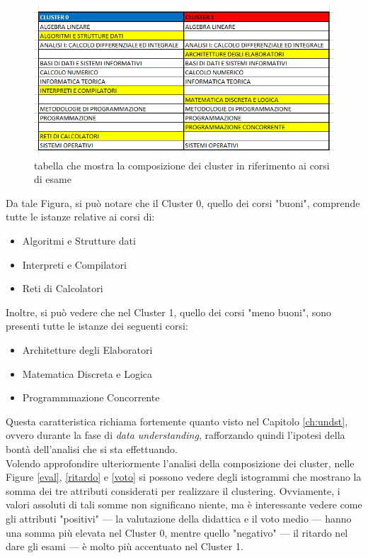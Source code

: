         \begin{figure}
            \centering
            \caption{tabella che mostra la composizione dei cluster in riferimento ai corsi di esame}
            \label{tabella}
            \includegraphics[scale=0.65]{../cluster/min_kmeans_2cl_corsi_cluster.png}
        \end{figure}

        Da tale Figura, si può notare che il Cluster 0, quello dei corsi "buoni", comprende tutte le istanze relative ai corsi di:

        \begin{itemize}
            \item Algoritmi e Strutture dati
            \item Interpreti e Compilatori
            \item Reti di Calcolatori
        \end{itemize}

        Inoltre, si può vedere che nel Cluster 1, quello dei corsi "meno buoni", sono presenti tutte le istanze dei seguenti corsi:

        \begin{itemize}
            \item Architetture degli Elaboratori
            \item Matematica Discreta e Logica
            \item Programmmazione Concorrente
        \end{itemize}

        Questa caratteristica richiama fortemente quanto visto nel Capitolo \ref{ch:undst}, ovvero durante la fase di \textit{data understanding}, rafforzando quindi l'ipotesi della bontà dell'analisi che si sta effettuando. \\

        Volendo approfondire ulteriormente l'analisi della composizione dei cluster, nelle Figure \ref{eval}, \ref{ritardo} e \ref{voto} si possono vedere degli istogrammi che mostrano la somma dei tre attributi considerati per realizzare il clustering. Ovviamente, i valori assoluti di tali somme non significano niente, ma è interessante vedere come gli attributi "positivi" --- la valutazione della didattica e il voto medio --- hanno una somma più elevata nel Cluster 0, mentre quello "negativo" --- il ritardo nel dare gli esami --- è molto più accentuato nel Cluster 1.


